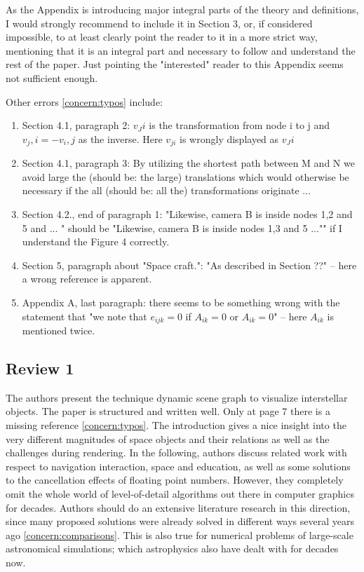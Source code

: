 \documentclass{article}
\begin{document}
As the Appendix is introducing major integral parts of the theory and definitions, I would strongly recommend to include it in Section 3, or, if considered impossible, to at least clearly point the reader to it in a more strict way, mentioning that it is an integral part and necessary to follow and understand the rest of the paper.
Just pointing the "interested" reader to this Appendix seems not sufficient enough.

Other errors \eqref{concern:typos} include:

\begin{enumerate}
\item Section 4.1, paragraph 2: $v_Ji$ is the transformation from node i to j and $v_j,i=-v_i,j$ as the inverse.
Here $v_{ji}$ is wrongly displayed as $v_Ji$
\item Section 4.1, paragraph 3: By utilizing the shortest path between M and N we avoid large the (should be: the large) translations which would otherwise be necessary if the all (should be: all the) transformations originate ...
\item Section 4.2., end of paragraph 1: "Likewise, camera B is inside nodes 1,2 and 5 and ...
" should be "Likewise, camera B is inside nodes 1,3 and 5 ..."" if I understand the Figure 4 correctly.
\item Section 5, paragraph about "Space craft.": "As described in Section ??" -- here a wrong reference is apparent.
\item Appendix A, last paragraph: there seems to be something wrong with the statement that "we note that $e_{ijk}=0$ if $A_{ik}=0$ or $A_{ik}=0$" -- here $A_{ik}$ is mentioned twice.
\end{enumerate}

\subsection*{Review 1}

The authors present the technique dynamic scene graph to visualize interstellar objects.
The paper is structured and written well.
Only at page 7 there is a missing reference \eqref{concern:typos}.
The introduction gives a nice insight into the very different magnitudes of space objects and their relations as well as the challenges during rendering.
In the following, authors discuss related work with respect to navigation interaction, space and education, as well as some solutions to the cancellation effects of floating point numbers.
However, they completely omit the whole world of level-of-detail algorithms out there in computer graphics for decades.
Authors should do an extensive literature research in this direction, since many proposed solutions were already solved in different ways several years ago \eqref{concern:comparisons}. 
This is also true for numerical problems of large-scale astronomical simulations; which astrophysics also have dealt with for decades now. 
\end{document}
